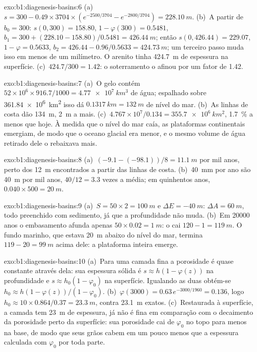 \begin{solution}{exo:b1:diagenesis-basins:6}
(a)~$s = 300 - 0.49\times3704\times(e^{-2500/3704} - e^{-2800/3704}) =
\qty{228.10}{m}$. (b)~A partir de $b_0 = 300$: $s(0, 300) = 158.80$, $1 - \varphi(300) =
0.5481$, $b_1 = 300 + (228.10 - 158.80)/0.5481 = \qty{426.44}{m}$; então
$s(0, 426.44) = 229.07$, $1 - \varphi = 0.5633$, $b_2 = 426.44 - 0.96/0.5633 =
\qty{424.73}{m}$; um terceiro passo muda isso em menos de um milímetro. O arenito tinha
\qty{424.7}{m} de espessura na superfície. (c)~$424.7/300 = 1.42$: o soterramento o
afinou por um fator de \num{1.42}.
\end{solution}

\begin{solution}{exo:b1:diagenesis-basins:7}
(a)~O gelo contém $52\times10^6\times916.7/1000 = \qty{4.77e7}{km^3}$ de água;
espalhado sobre \qty{361.84e6}{km^2} isso dá $\qty{0.1317}{km} = \qty{132}{m}$ de nível
do mar. (b)~As linhas de costa dão \qty{134}{m}, \qty{2}{m} a mais. (c)~$4.767\times
10^7/0.134 = \qty{355.7e6}{km^2}$, \qty{1.7}{\%} a menos que hoje. À medida que o nível
do mar caía, as plataformas continentais emergiam, de modo que o oceano glacial era menor,
e o mesmo volume de água retirado dele o rebaixava mais.
\end{solution}

\begin{solution}{exo:b1:diagenesis-basins:8}
(a)~$(-9.1 - (-98.1))/8 = \qty{11.1}{m}$ por mil anos, perto dos \qty{12}{m} encontrados
a partir das linhas de costa. (b)~\qty{40}{mm} por ano são \qty{40}{m} por mil anos,
$40/12 = 3.3$ vezes a média; em quinhentos anos, $0.040\times500 = \qty{20}{m}$.
\end{solution}

\begin{solution}{exo:b1:diagenesis-basins:9}
(a)~$S = 50\times2 = \qty{100}{m}$ e $\Delta E = \qty{-40}{m}$:
$\Delta A = \qty{60}{m}$, todo preenchido com sedimento, já que a profundidade não muda.
(b)~Em \num{20000} anos o embasamento afunda apenas $50\times0.02 = \qty{1}{m}$:
o  cai $120 - 1 = \qty{119}{m}$. O fundo marinho, que estava
\qty{20}{m} abaixo do nível do mar, termina $119 - 20 = \qty{99}{m}$ acima dele: a
plataforma inteira emerge.
\end{solution}

\begin{solution}{exo:b1:diagenesis-basins:10}
(a)~Para uma camada fina a porosidade é quase constante através dela: sua espessura sólida é
$s \approx h(1 - \varphi(z))$ na profundidade e $s \approx h_0(1 -
\varphi_0)$ na superfície. Igualando as duas obtém-se $h_0 \approx h(1 -
\varphi(z))/(1 - \varphi_0)$. (b)~$\varphi(3000) = 0.63\,e^{-3000/1960} =
0.136$, logo $h_0 \approx 10\times0.864/0.37 = \qty{23.3}{m}$, contra
\qty{23.1}{m} exatos. (c)~Restaurada à superfície, a camada tem \qty{23}{m} de espessura,
já não é fina em comparação com o decaimento da porosidade perto da superfície: sua
porosidade cai de $\varphi_0$ no topo para menos na base, de modo que seus grãos cabem em
um pouco menos que a espessura calculada com $\varphi_0$ por toda parte.
\end{solution}

